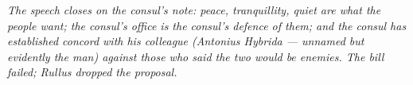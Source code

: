 \textit{The speech closes on the consul's note: peace,
tranquillity, quiet are what the people want; the consul's
office is the consul's defence of them; and the consul has
established concord with his colleague (Antonius Hybrida ---
unnamed but evidently the man) against those who said the two
would be enemies. The bill failed; Rullus dropped the
proposal.}

